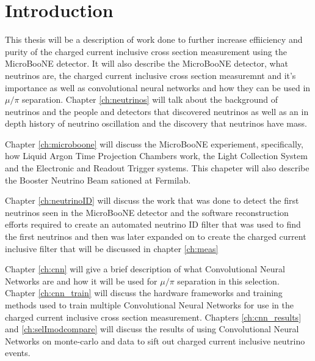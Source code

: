 \chapter{Introduction}
This thesis will be a description of work done to further increase effiiciency and purity of the charged current inclusive cross section measurement using the MicroBooNE detector. It will also describe the MicroBooNE detector, what neutrinos are, the charged current inclusive cross section measuremnt and it's importance as well as convolutional neural networks and how they can be used in $\mu/\pi$ separation. 
Chapter \ref{ch:neutrinos} will talk about the background of neutrinos and the people and detectors that discovered neutrinos as well as an in depth history of neutrino oscillation and the discovery that neutrinos have mass. 

Chapter \ref{ch:microboone} will discuss the MicroBooNE experiement, specifically,  how Liquid Argon Time Projection Chambers work, the Light Collection System and the Electronic and Readout Trigger systems. This chapeter will also describe the Booster Neutrino Beam sationed at Fermilab.
 
Chapter \ref{ch:neutrinoID} will discuss the work that was done to detect the first neutrinos seen in the MicroBooNE detector and the software reconstruction efforts required to create an automated neutrino ID filter that was used to find the first neutrinos and then was later expanded on to create the charged current inclusive filter that will be discussed in chapter \ref{ch:meas}

Chapter \ref{ch:cnn} will give a brief description of what Convolutional Neural Networks are and how it will be used for $\mu/\pi$ separation in this selection.
Chapter \ref{ch:cnn_train} will discuss the hardware frameworks and training methods used to train multiple Convolutional Neural Networks for use in the charged current inclusive cross section measurement.
Chapters \ref{ch:cnn_results} and \ref{ch:selImodcompare} will discuss the results of using Convolutional Neural Networks on monte-carlo and data to sift out charged current inclusive neutrino events. 
